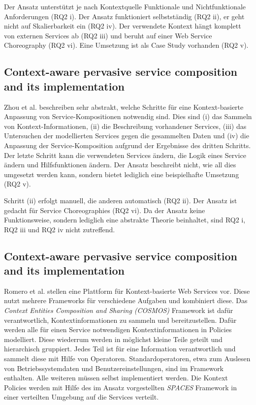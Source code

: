 \documentclass[conference,compsoc]{IEEEtran}
\begin{document}
Der Ansatz unterstützt je nach Kontextquelle Funktionale und Nichtfunktionale Anforderungen (RQ2 i). Der Ansatz funktioniert selbstständig (RQ2 ii), er geht nicht auf Skalierbarkeit ein (RQ2 iv). Der verwendete Kontext hängt komplett von externen Services ab (RQ2 iii) und beruht auf einer Web Service Choreography (RQ2 vi). Eine Umsetzung ist als Case Study vorhanden (RQ2 v).

\subsection{Context-aware pervasive service composition and its implementation}
Zhou et al. \cite{ZGP11} beschreiben sehr abstrakt, welche Schritte für eine Kontext-basierte Anpassung von Service-Kompositionen notwendig sind. Dies sind (i) das Sammeln von Kontext-Informationen, (ii) die Beschreibung vorhandener Services, (iii) das Untersuchen der modellierten Services gegen die gesammelten Daten und (iv) die Anpassung der Service-Komposition aufgrund der Ergebnisse des dritten Schritts. Der letzte Schritt kann die verwendeten Services ändern, die Logik eines Service ändern und Hilfsfunktionen ändern. Der Ansatz beschreibt nicht, wie all dies umgesetzt werden kann, sondern bietet lediglich eine beispielhafte Umsetzung (RQ2 v).

Schritt (ii) erfolgt manuell, die anderen automatisch (RQ2 ii). Der Ansatz ist gedacht für Service Choreographies (RQ2 vi). Da der Ansatz keine Funktionsweise, sondern lediglich eine abstrakte Theorie beinhaltet, sind RQ2 i, RQ2 iii und RQ2 iv nicht zutreffend.

\subsection{Context-aware pervasive service composition and its implementation}
Romero et al. \cite{RRS10} stellen eine Plattform für Kontext-basierte Web Services vor. Diese nutzt mehrere Frameworks für verschiedene Aufgaben und kombiniert diese. Das \textit{Context Entities Composition and Sharing (COSMOS)} Framework \cite{RCS08} ist dafür verantwortlich, Kontextinformationen zu sammeln und bereitzustellen. Dafür werden alle für einen Service notwendigen Kontextinformationen in Policies modelliert. Diese wiederrum werden in möglichst kleine Teile geteilt und hierarchisch gruppiert. Jedes Teil ist für eine Information verantwortlich und sammelt diese mit Hilfe von Operatoren. Standardoperatoren, etwa zum Auslesen von Betriebssystemdaten und Benutzereinstellungen, sind im Framework enthalten. Alle weiteren müssen selbst implementiert werden. Die Kontext Policies werden mit Hilfe des im Ansatz vorgestellten \textit{SPACES} Framework \cite{SMF09} in einer verteilten Umgebung auf die Services verteilt.
\end{document}
